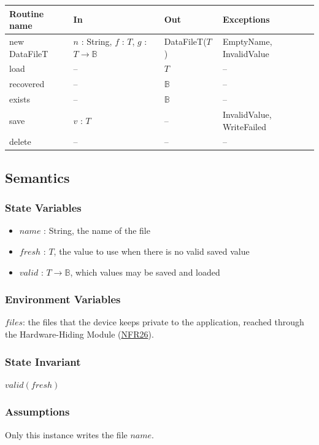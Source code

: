 \documentclass[10pt, titlepage]{article}
\newcommand{\srsurl}{https://team-hindsight.github.io/ophthamology-game/SRS/SRS.pdf}
\newcommand{\srsitemref}[2]{\href{\srsurl\#nameddest=#1}{#2}}
\newcommand{\B}{\mathbb{B}}
\newcommand{\T}[1]{\mathit{#1}}          %
\newenvironment{accessprogs}{%
  \begin{center}\small
  \begin{tabular}{>{\raggedright\arraybackslash}p{3.0cm}
    >{\raggedright\arraybackslash}p{5.0cm}
    >{\raggedright\arraybackslash}p{2.8cm}
    >{\raggedright\arraybackslash}p{3.4cm}}
  \toprule
  \textbf{Routine name} & \textbf{In} & \textbf{Out} & \textbf{Exceptions}\\
  \midrule}{%
  \bottomrule
  \end{tabular}
  \end{center}}
\begin{document}
\begin{accessprogs}
new DataFileT & $n$ : String, $f$ : $T$, $g$ : $T \to \B$ & DataFileT($T$) &
EmptyName, InvalidValue\\
load & -- & $T$ & --\\
recovered & -- & $\B$ & --\\
exists & -- & $\B$ & --\\
save & $v$ : $T$ & -- & InvalidValue, WriteFailed\\
delete & -- & -- & --\\
\end{accessprogs}

\subsection{Semantics}

\subsubsection{State Variables}

\begin{itemize}
\item $\T{name}$ : String, the name of the file
\item $\T{fresh}$ : $T$, the value to use when there is no valid saved value
\item $\T{valid}$ : $T \to \B$, which values may be saved and loaded
\end{itemize}

\subsubsection{Environment Variables}

$\T{files}$: the files that the device keeps private to the application,
reached through the Hardware-Hiding Module
(\srsitemref{NFR_DataProtection}{NFR26}).

\subsubsection{State Invariant}

$\T{valid}(\T{fresh})$

\subsubsection{Assumptions}

Only this instance writes the file $\T{name}$.
\end{document}
